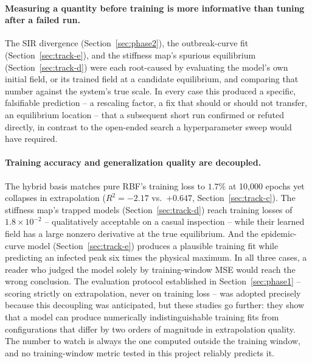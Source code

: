 \paragraph{Measuring a quantity before training is more informative than
tuning after a failed run.} The SIR divergence (Section~\ref{sec:phase2}), the
outbreak-curve fit (Section~\ref{sec:track-e}), and the stiffness map's
spurious equilibrium (Section~\ref{sec:track-d}) were each root-caused by
evaluating the model's own initial field, or its trained field at a candidate
equilibrium, and comparing that number against the system's true scale. In
every case this produced a specific, falsifiable prediction -- a rescaling
factor, a fix that should or should not transfer, an equilibrium location --
that a subsequent short run confirmed or refuted directly, in contrast to the
open-ended search a hyperparameter sweep would have required.

\paragraph{Training accuracy and generalization quality are decoupled.} The
hybrid basis matches pure RBF's training loss to $1.7\%$ at 10{,}000 epochs
yet collapses in extrapolation ($R^2=-2.17$ vs.\ $+0.647$,
Section~\ref{sec:track-c}). The stiffness map's trapped models
(Section~\ref{sec:track-d}) reach training losses of $1.8\times10^{-2}$ --
qualitatively acceptable on a casual inspection -- while their learned field
has a large nonzero derivative at the true equilibrium. And the
epidemic-curve model (Section~\ref{sec:track-e}) produces a plausible
training fit while predicting an infected peak six times the physical
maximum. In all three cases, a reader who judged the model solely by
training-window MSE would reach the wrong conclusion. The evaluation
protocol established in Section~\ref{sec:phase1} -- scoring strictly on
extrapolation, never on training loss -- was adopted precisely because this
decoupling was anticipated, but these studies go further: they show that a
model can produce numerically indistinguishable training fits from
configurations that differ by two orders of magnitude in extrapolation
quality. The number to watch is always the one computed outside the training
window, and no training-window metric tested in this project reliably
predicts it.

